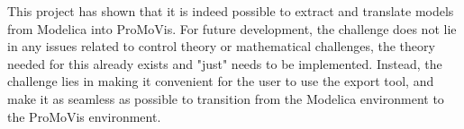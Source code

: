 
This project has shown that it is indeed possible to extract and translate models from Modelica into ProMoVis. For future development, the challenge does not lie in any issues related to control theory or mathematical challenges, the theory needed for this already exists and "just" needs to be implemented. Instead, the challenge lies in making it convenient for the user to use the export tool, and make it as seamless as possible to transition from the Modelica environment to the ProMoVis environment. 
